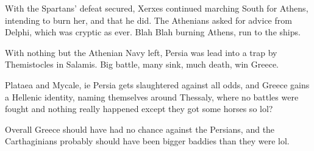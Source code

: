 \documentclass[twoside, a4paper, 12pt]{article}
\begin{document}
\par\vspace{1em}

With the Spartans' defeat secured, Xerxes continued marching South for
Athens, intending to burn her, and that he did. The Athenians asked for advice
from Delphi, which was cryptic as ever.
Blah Blah burning Athens, run to the ships.

\par\vspace{1em}

With nothing but the Athenian Navy left, Persia was lead into a trap
by Themistocles in Salamis. Big battle, many sink, much death, win Greece.

\par\vspace{1em}

Plataea and Mycale, ie Persia gets slaughtered against all odds, and
Greece gains a Hellenic identity, naming themselves around Thessaly, where
no battles were fought and nothing really happened except they got some horses
so lol?

\par\vspace{1em}

Overall Greece should have had no chance against the Persians, and the
Carthaginians probably should have been bigger baddies than they were lol.

\newpage

\listoffigures
\printbibliography
\end{document}
